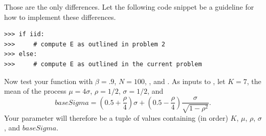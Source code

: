 \begin{problem}
Those are the only differences. Let the following code snippet be a guideline for how to implement
these differences.
\begin{lstlisting}
>>> if iid:
>>>     # compute E as outlined in problem 2
>>> else:
>>>     # compute E as outlined in the current problem
\end{lstlisting}

Now test your function with $\beta = .9$, $N = 100$, , and .
As inputs to , let $K=7$, the mean of the process
$\mu=4\sigma$, $\rho = 1/2$, $\sigma=1/2$, and
\[baseSigma=(0.5+\frac{\rho}{4})\sigma +
(0.5 - \frac{\rho}{4})\frac{\sigma}{\sqrt{1-\rho^2}}.
\]
Your  parameter will therefore be a tuple of values containing (in order)
$K$, $\mu$, $\rho$, $\sigma$, and $baseSigma$.
\end{problem}

